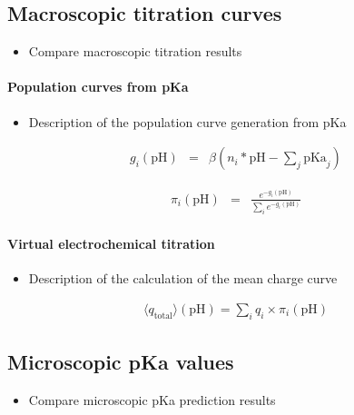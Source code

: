 \documentclass[9pt,lineno,final]{elife}
\newcommand{\pH}{\mathrm{pH}}
\newcommand{\pKa}{\mathrm{pKa}}
\begin{document}
\subsection{Macroscopic titration curves}
\begin{itemize}
	\item Compare macroscopic titration results
\end{itemize}

\paragraph{Population curves from pKa}

\begin{itemize}
	\item Description of the population curve generation from pKa \\
\end{itemize}

\begin{eqnarray}
	g_i(\pH) &=& \beta \left( n_i*\pH - \sum_j \pKa_j \right)
\end{eqnarray}

\begin{eqnarray}
	\pi_i(\pH) &=& \frac{e^{-g_i(\pH)}}{\sum_i e^{-g_i(\pH)} }
\end{eqnarray}

\paragraph{Virtual electrochemical titration}


\begin{itemize}
	\item Description of the calculation of the mean charge curve \\
\end{itemize}

\begin{eqnarray}
	\langle q_\text{total} \rangle (\pH) = \sum_i q_i \times \pi_i(\pH) 
\end{eqnarray}



\subsection{Microscopic pKa values}
\begin{itemize}
	\item Compare microscopic pKa prediction results
\end{itemize}
\end{document}
